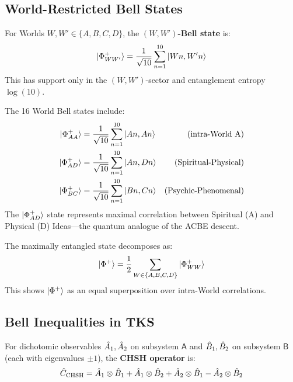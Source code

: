 \subsection{World-Restricted Bell States}

\begin{definition}
\label{def:world-bell}
For Worlds $W, W' \in \{A, B, C, D\}$, the \textbf{$(W, W')$-Bell state} is:
\[
|\Phi^+_{WW'}\rangle = \frac{1}{\sqrt{10}} \sum_{n=1}^{10} |Wn, W'n\rangle
\]
This has support only in the $(W, W')$-sector and entanglement entropy $\log(10)$.
\end{definition}

\begin{example}
\label{ex:world-bell-states}
The 16 World Bell states include:
\begin{align}
|\Phi^+_{AA}\rangle &= \frac{1}{\sqrt{10}} \sum_{n=1}^{10} |An, An\rangle & \text{(intra-World A)} \\
|\Phi^+_{AD}\rangle &= \frac{1}{\sqrt{10}} \sum_{n=1}^{10} |An, Dn\rangle & \text{(Spiritual-Physical)} \\
|\Phi^+_{BC}\rangle &= \frac{1}{\sqrt{10}} \sum_{n=1}^{10} |Bn, Cn\rangle & \text{(Psychic-Phenomenal)}
\end{align}
The $|\Phi^+_{AD}\rangle$ state represents maximal correlation between Spiritual (A) and Physical (D) Ideas---the quantum analogue of the ACBE descent.
\end{example}

\begin{proposition}
\label{prop:bell-decomposition}
The maximally entangled state decomposes as:
\[
|\Phi^+\rangle = \frac{1}{2} \sum_{W \in \{A,B,C,D\}} |\Phi^+_{WW}\rangle
\]
This shows $|\Phi^+\rangle$ as an equal superposition over intra-World correlations.
\end{proposition}

\subsection{Bell Inequalities in TKS}

\begin{definition}
\label{def:chsh-observable}
For dichotomic observables $\hat{A}_1, \hat{A}_2$ on subsystem $\mathsf{A}$ and $\hat{B}_1, \hat{B}_2$ on subsystem $\mathsf{B}$ (each with eigenvalues $\pm 1$), the \textbf{CHSH operator} is:
\[
\hat{C}_{\mathrm{CHSH}} = \hat{A}_1 \otimes \hat{B}_1 + \hat{A}_1 \otimes \hat{B}_2 + \hat{A}_2 \otimes \hat{B}_1 - \hat{A}_2 \otimes \hat{B}_2
\]
\end{definition}

